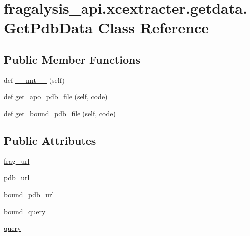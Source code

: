 \hypertarget{classfragalysis__api_1_1xcextracter_1_1getdata_1_1_get_pdb_data}{}\section{fragalysis\+\_\+api.\+xcextracter.\+getdata.\+Get\+Pdb\+Data Class Reference}
\label{classfragalysis__api_1_1xcextracter_1_1getdata_1_1_get_pdb_data}
\subsection*{Public Member Functions}
\begin{DoxyCompactItemize}
\item 
def \hyperlink{classfragalysis__api_1_1xcextracter_1_1getdata_1_1_get_pdb_data_abe03d6df71459bf479db778df7122186}{\+\_\+\+\_\+init\+\_\+\+\_\+} (self)
\item 
def \hyperlink{classfragalysis__api_1_1xcextracter_1_1getdata_1_1_get_pdb_data_a1785640f7d8841b41773f04577065366}{get\+\_\+apo\+\_\+pdb\+\_\+file} (self, code)
\item 
def \hyperlink{classfragalysis__api_1_1xcextracter_1_1getdata_1_1_get_pdb_data_afcb12b3a8f39a7d54917eefed0a1b4af}{get\+\_\+bound\+\_\+pdb\+\_\+file} (self, code)
\end{DoxyCompactItemize}
\subsection*{Public Attributes}
\begin{DoxyCompactItemize}
\item 
\hyperlink{classfragalysis__api_1_1xcextracter_1_1getdata_1_1_get_pdb_data_a2cbb80e8804df35ddc3907e128bf5611}{frag\+\_\+url}
\item 
\hyperlink{classfragalysis__api_1_1xcextracter_1_1getdata_1_1_get_pdb_data_a8b6633bc84797be7178323c1ff5d0474}{pdb\+\_\+url}
\item 
\hyperlink{classfragalysis__api_1_1xcextracter_1_1getdata_1_1_get_pdb_data_a1edc9f29f240166dab511937439ab355}{bound\+\_\+pdb\+\_\+url}
\item 
\hyperlink{classfragalysis__api_1_1xcextracter_1_1getdata_1_1_get_pdb_data_a69a3d1dd7ec122a02aff1945b82ee432}{bound\+\_\+query}
\item 
\hyperlink{classfragalysis__api_1_1xcextracter_1_1getdata_1_1_get_pdb_data_ad09eb6782120b4d3114a9e5c3f66f373}{query}
\end{DoxyCompactItemize}


